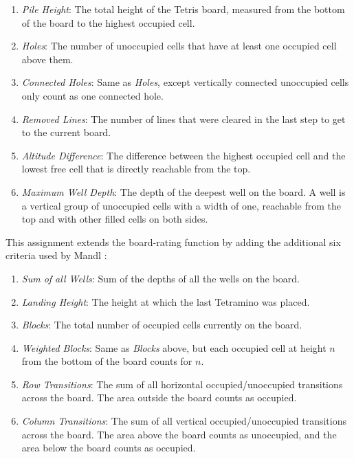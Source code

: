 \documentclass[a4paper,11pt]{article}
\newcounter{savedcounter}
\begin{document}
\begin{enumerate}
  \item \emph{Pile Height}: The total height of the Tetris board, measured from
      the bottom of the board to the highest occupied cell.
  \item \emph{Holes}: The number of unoccupied cells that have at least one
      occupied cell above them.
  \item \emph{Connected Holes}: Same as \emph{Holes}, except vertically
      connected unoccupied cells only count as one connected hole.
  \item \emph{Removed Lines}: The number of lines that were cleared in the last
      step to get to the current board.
  \item \emph{Altitude Difference}: The difference between the highest occupied
      cell and the lowest free cell that is directly reachable from the top.
  \item \emph{Maximum Well Depth}: The depth of the deepest well on the board.
      A well is a vertical group of unoccupied cells with a width of one,
      reachable from the top and with other filled cells on both sides.
  \setcounter{savedcounter}{\theenumi}
\end{enumerate}

This assignment extends the board-rating function by adding the additional six
criteria used by Mandl \cite{Mandl2005}:

\begin{enumerate}
  \setcounter{enumi}{\thesavedcounter}
  \item \emph{Sum of all Wells}: Sum of the depths of all the wells on the board.
  \item \emph{Landing Height}: The height at which the last Tetramino was placed.
  \item \emph{Blocks}: The total number of occupied cells currently on the board.
  \item \emph{Weighted Blocks}: Same as \emph{Blocks} above, but each occupied
      cell at height $n$ from the bottom of the board counts for $n$.
  \item \emph{Row Transitions}: The sum of all horizontal occupied/unoccupied
      transitions across the board.
      The area outside the board counts as occupied.
  \item \emph{Column Transitions}: The sum of all vertical occupied/unoccupied
      transitions across the board.
      The area above the board counts as unoccupied, and the area below the
      board counts as occupied.
\end{enumerate}
\end{document}
